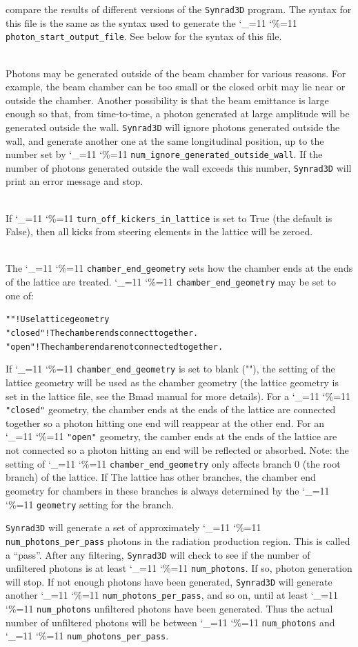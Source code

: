 \documentclass[11pt,openany]{report}
\newcommand{\srthree}{\texttt{Synrad3D}\xspace}
\newcommand\ttcmd{\begingroup\catcode`\_=11 \catcode`\%=11 \dottcmd}
\newcommand\dottcmd[1]{\texttt{#1}\endgroup}
\newcommand{\vn}{\ttcmd}
\newcommand{\Newline}{\hfil \\}
\newlength{\ExBeg}
\newlength{\ExEnd}
\newenvironment{example}
  {\vspace{\ExBeg} \begin{alltt}}
  {\end{alltt} \vspace{\ExEnd}}
\begin{document}
\begin{description}
compare the results of different versions of the \srthree program. The
syntax for this file is the same as the syntax used to generate the
\vn{photon_start_output_file}. See below for the syntax of this file.
  \item[\vn{num_ignore_generated_outside_wall}] \Newline
Photons may be generated outside of the beam chamber for various
reasons. For example, the beam chamber can be too small or the closed
orbit may lie near or outside the chamber. Another possibility is that
the beam emittance is large enough so that, from time-to-time, a
photon generated at large amplitude will be generated outside the
wall. \srthree will ignore photons generated outside the wall, and
generate another one at the same longitudinal position, up to the
number set by \vn{num_ignore_generated_outside_wall}. If the number of
photons generated outside the wall exceeds this number, \srthree will
print an error message and stop.
  \item[\vn{turn_off_kickers_in_lattice}] \Newline
If \vn{turn_off_kickers_in_lattice} is set to True (the default is
False), then all kicks from steering elements in the lattice will be zeroed.
  \item[\vn{chamber_end_geometry}] \Newline
The \vn{chamber_end_geometry} sets how the chamber ends at the ends of the lattice
are treated. \vn{chamber_end_geometry} may be set to one of:
\begin{example}
  ""            ! Use lattice geometry
  "closed"      ! The chamber ends connect together.
  "open"        ! The chamber end are not connected together.
\end{example}
If \vn{chamber_end_geometry} is set to blank (""), the setting of the lattice geometry
will be used as the chamber geometry (the lattice geometry is set in the lattice file, see
the Bmad manual\cite{b:bmad} for more details). For a \vn{"closed"} geometry, the chamber
ends at the ends of the lattice are connected together so a photon hitting one end will
reappear at the other end.  For an \vn{"open"} geometry, the camber ends at the ends of
the lattice are not connected so a photon hitting an end will be reflected or absorbed.
Note: the setting of \vn{chamber_end_geometry} only affects branch 0 (the root branch) of
the lattice. If The lattice has other branches, the chamber end geometry for chambers in
these branches is always determined by the \vn{geometry} setting for the branch.
\end{description}

\srthree will generate a set of approximately \vn{num_photons_per_pass} photons in the
radiation production region.  This is called a ``pass''.  After any filtering, \srthree
will check to see if the number of unfiltered photons is at least \vn{num_photons}.  If
so, photon generation will stop. If not enough photons have been generated, \srthree will
generate another \vn{num_photons_per_pass}, and so on, until at least \vn{num_photons}
unfiltered photons have been generated. Thus the actual number of unfiltered photons
will be between \vn{num_photons} and \vn{num_photons_per_pass}.
\end{document}
